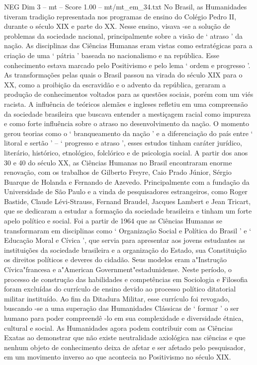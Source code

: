 \begin{textsample}{NEG Dim 3 – mt – Score 1.00 – mt/mt\_em\_34.txt}
No Brasil, as Humanidades tiveram tradição representada nos programas de ensino do Colégio Pedro II, durante o século XIX e parte do XX.
Nesse ensino, visava -se a solução de problemas da sociedade nacional, principalmente sobre a visão de ‘ atraso ’ da nação.
As disciplinas das Ciências Humanas eram vistas como estratégicas para a criação de uma ‘ pátria ’ baseada no nacionalismo e na república.
Esse conhecimento estava marcado pelo Positivismo e pelo lema ‘ ordem e progresso ’.
As transformações pelas quais o Brasil passou na virada do século XIX para o XX, como a proibição da escravidão e o advento da república, geraram a produção de conhecimentos voltados para as questões sociais, porém com um viés racista.
A influência de teóricos alemães e ingleses refletiu em uma compreensão da sociedade brasileira que buscava entender a mestiçagem racial como impureza e como forte influência sobre o atraso no desenvolvimento da nação.
O momento gerou teorias como o ‘ branqueamento da nação ’ e a diferenciação do país entre ‘ litoral e sertão ’ – ‘ progresso e atraso ’, esses estudos tinham caráter jurídico, literário, histórico, etnológico, folclórico e de psicologia social.
A partir dos anos 30 e 40 do século XX, as Ciências Humanas no Brasil encontraram enorme renovação, com os trabalhos de Gilberto Freyre, Caio Prado Júnior, Sérgio Buarque de Holanda e Fernando de Azevedo.
Principalmente com a fundação da Universidade de São Paulo e a vinda de pesquisadores estrangeiros, como Roger Bastide, Claude Lévi-Strauss, Fernand Braudel, Jacques Lambert e Jean Tricart, que se dedicaram a estudar a formação da sociedade brasileira e tinham um forte apelo político e social.
Foi a partir de 1964 que as Ciências Humanas se transformaram em disciplinas como ‘ Organização Social e Política do Brasil ’ e ‘ Educação Moral e Cívica ’, que servia para apresentar aos jovens estudantes as instituições da sociedade brasileira e a organização do Estado, sua Constituição os direitos políticos e deveres do cidadão.
Seus modelos eram a"Instrução Cívica"francesa e a"American Government"estadunidense.
Neste período, o processo de construção das habilidades e competências em Sociologia e Filosofia foram excluídas do currículo de ensino devido ao processo político ditatorial militar instituído.
Ao fim da Ditadura Militar, esse currículo foi revogado, buscando -se a uma superação das Humanidades Clássicas de ‘ formar ’ o ser humano para poder compreendê -lo em sua complexidade e diversidade étnica, cultural e social.
As Humanidades agora podem contribuir com as Ciências Exatas ao demonstrar que não existe neutralidade axiológica nas ciências e que nenhum objeto de conhecimento deixa de afetar e ser afetado pelo pesquisador, em um movimento inverso ao que acontecia no Positivismo no século XIX.

\end{textsample}
